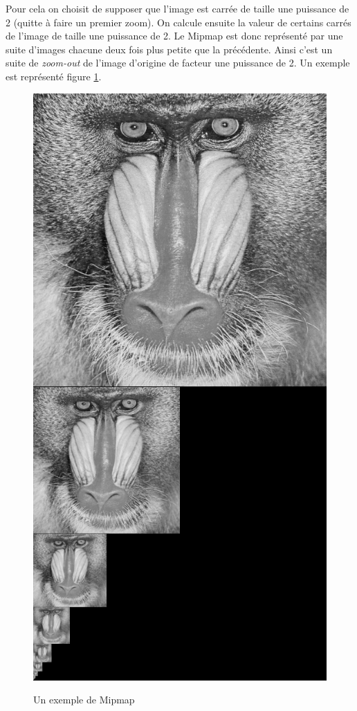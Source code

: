 Pour cela on choisit de supposer que l'image est carrée de taille une puissance de 2 (quitte à faire un premier zoom). On calcule ensuite la valeur de certains carrés de l'image de taille une puissance de 2.
Le Mipmap est donc représenté par une suite d'images chacune deux fois plus petite que la précédente. Ainsi c'est un suite de \emph{zoom-out} de l'image d'origine de facteur une puissance de 2. Un exemple est représenté figure \ref{MipMap_real}.

\begin{figure}[h!]
\centering
\caption{Un exemple de Mipmap}
\includegraphics[scale=0.4]{MipMap_real} %
\label{MipMap_real}
\end{figure}

